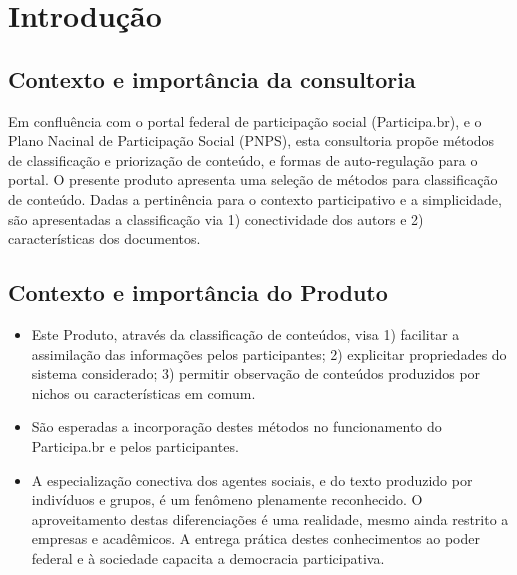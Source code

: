 \documentclass[12pt]{article}
\newcommand{\PalavrasChave}{reconhecimento de padrões, redes complexas, processamento de linguagem natural, participação social}
\begin{document}



\tableofcontents
\newpage

\begin{abstract}
Este documento descreve procedimentos selecionados para categorização de conteúdo do portal federal da participação social (Participa.br). O produto relacionado no termo de referência desta consultoria preve somente propostas de especificações e códigos. Dado o aspecto prático do trabalho, estão descritas o contexto e possibilidade consideradas, asism como implementações e códigos operantes. Parte deste trabalho é acessível online via http, como os scripts no IPython Notebook e o endpoint SparQL que serve os dados do Participa.br com critérios semânticos.\\

{\bf Palavras-chave:} \PalavrasChave.
\end{abstract}
\newpage

\section{Introdução}
\subsection{Contexto e importância da consultoria}
Em confluência com o portal federal de participação social (Participa.br), e o Plano Nacinal de Participação Social (PNPS), esta consultoria propõe métodos de classificação e priorização de conteúdo,  e formas de auto-regulação para o portal. O presente produto apresenta uma seleção de métodos para classificação de conteúdo. Dadas a pertinência para o contexto participativo e a simplicidade, são apresentadas a classificação via 1) conectividade dos autors e 2) características dos documentos.
\subsection{Contexto e importância do Produto}
\begin{itemize}
    \item Este Produto, através da classificação de conteúdos, visa 1) facilitar a assimilação das informações pelos participantes; 2) explicitar propriedades do sistema considerado; 3) permitir observação de conteúdos produzidos por nichos ou características em comum.
    \item São esperadas a incorporação destes métodos no funcionamento do Participa.br e pelos participantes.
    \item A especialização conectiva dos agentes sociais, e do texto produzido por indivíduos e grupos, é um fenômeno plenamente reconhecido. O aproveitamento destas diferenciações é uma realidade, mesmo ainda restrito a empresas e acadêmicos. A entrega prática destes conhecimentos ao poder federal e à sociedade capacita a democracia participativa.
\end{itemize}
\end{document}
